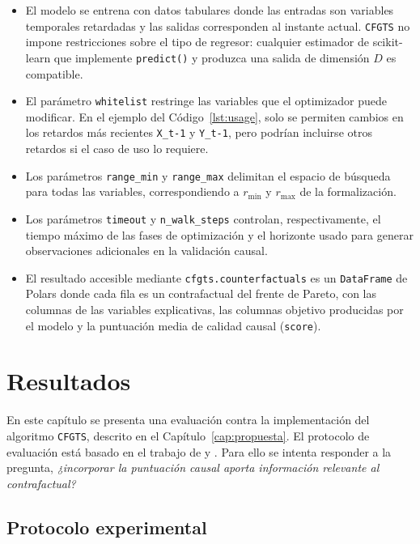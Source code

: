 \documentclass[12pt]{report} %
\begin{document}
\begin{itemize}
    \item El modelo se entrena con datos tabulares donde las entradas son variables temporales retardadas y las salidas corresponden al instante actual. \texttt{CFGTS} no impone restricciones sobre el tipo de regresor: cualquier estimador de scikit-learn que implemente \texttt{predict()} y produzca una salida de dimensión $D$ es compatible.
    \item El parámetro \texttt{whitelist} restringe las variables que el optimizador puede modificar. En el ejemplo del Código~\ref{lst:usage}, solo se permiten cambios en los retardos más recientes \texttt{X\_t-1} y \texttt{Y\_t-1}, pero podrían incluirse otros retardos si el caso de uso lo requiere.
    \item Los parámetros \texttt{range\_min} y \texttt{range\_max} delimitan el espacio de búsqueda para todas las variables, correspondiendo a $r_{\min}$ y $r_{\max}$ de la formalización.
    \item Los parámetros \texttt{timeout} y \texttt{n\_walk\_steps} controlan, respectivamente, el tiempo máximo de las fases de optimización y el horizonte usado para generar observaciones adicionales en la validación causal.
    \item El resultado accesible mediante \texttt{cfgts.counterfactuals} es un \texttt{DataFrame} de Polars donde cada fila es un contrafactual del frente de Pareto, con las columnas de las variables explicativas, las columnas objetivo producidas por el modelo y la puntuación media de calidad causal (\texttt{score}).
\end{itemize}

\chapter{Resultados}
\label{cap:resultados}

En este capítulo se presenta una evaluación contra la implementación del algoritmo \texttt{CFGTS}, descrito en el Capítulo~\ref{cap:propuesta}. El protocolo de evaluación está basado en el trabajo de \cite{Wang2023} y \cite{Kan2024}. Para ello se intenta responder a la pregunta, \textit{¿incorporar la puntuación causal aporta información relevante al contrafactual?}

\section{Protocolo experimental}
\end{document}
